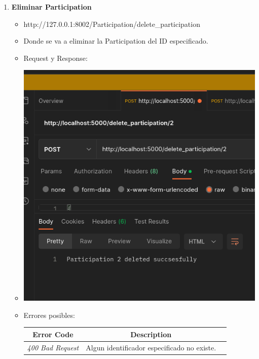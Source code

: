 \documentclass{article}
\begin{document}
\begin{enumerate}
    \item \textbf{Eliminar Participation}
    \begin{itemize}
        \item http://127.0.0.1:8002/Participation/delete\_participation
        \item Donde se va a eliminar la Participation del ID
        especificado.
        \item Request y Response:
        \item \includegraphics[scale=.5]{assets/participation/delete.png}
        \item Errores posibles: \begin{table}[H] \centering \begin{tabular}{|c|c|l|} \hline
        \textbf{Error Code} & \textbf{Description} \\ \hline \textit{400 Bad
        Request} & Algun identificador especificado no existe. \\ \hline
        \end{tabular} \end{table}
        
    \end{itemize}
\end{enumerate}

\end{document}
